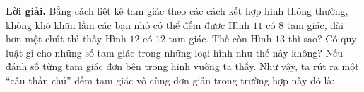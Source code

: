 	\begin{figure}[H]
		\centering
		\vspace*{-5pt}
		\captionsetup{labelformat= empty, justification=centering}
		\captionsetup[subfigure]{labelformat=empty}
		\hfill{}
		\hfill
		\hfill
		\hfill
		\hfill
		\vspace*{-10pt}
	\end{figure} 
	\textbf{\color{toancuabi}Lời giải.}
	\vskip 0.1cm
	Bằng cách liệt kê tam giác theo các cách kết hợp hình thông thường, không khó khăn lắm các bạn nhỏ có thể đếm được Hình $11$ có $8$ tam giác, dài hơn một chút thì thấy Hình $12$ có $12$ tam giác. Thế còn Hình $13$ thì sao? Có quy luật gì cho những số tam giác trong những loại hình như thế này không?
	\vskip 0.1cm
		Nếu đánh số từng tam giác đơn bên trong hình vuông ta thấy.
		\vskip 0.1cm
		Như vậy, ta rút ra một “câu thần chú” đếm tam giác vô cùng đơn giản trong trường hợp này đó là:

